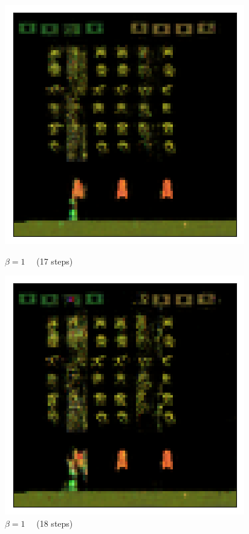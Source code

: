 \begin{figure}[h!]
\begin{multicols}{4}
    \includegraphics[scale=0.4]{figures/results/colour_separated/beta_1_posterior_sample_13.png}
    \caption{$\beta=1\quad$ (17 steps)}
    \includegraphics[scale=0.4]{figures/results/colour_separated/beta_1_posterior_sample_18.png}
    \caption{$\beta=1\quad$ (18 steps)}
\end{multicols}


\end{figure}
